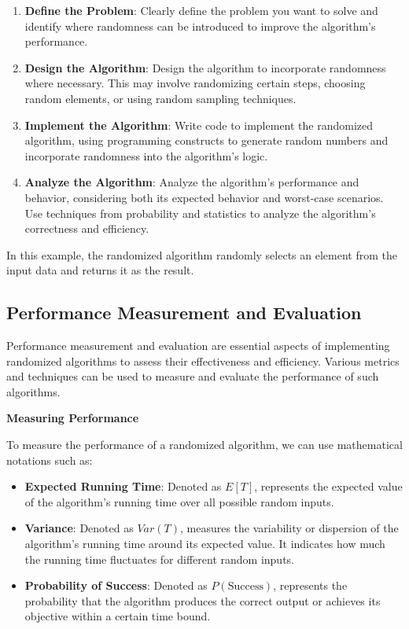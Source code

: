 \documentclass[12pt]{book} %
\begin{document}
\begin{enumerate}
    \item \textbf{Define the Problem}: Clearly define the problem you want to solve and identify where randomness can be introduced to improve the algorithm's performance.
    
    \item \textbf{Design the Algorithm}: Design the algorithm to incorporate randomness where necessary. This may involve randomizing certain steps, choosing random elements, or using random sampling techniques.
    
    \item \textbf{Implement the Algorithm}: Write code to implement the randomized algorithm, using programming constructs to generate random numbers and incorporate randomness into the algorithm's logic.
    
    \item \textbf{Analyze the Algorithm}: Analyze the algorithm's performance and behavior, considering both its expected behavior and worst-case scenarios. Use techniques from probability and statistics to analyze the algorithm's correctness and efficiency.
\end{enumerate}

In this example, the randomized algorithm randomly selects an element from the input data and returns it as the result.

\subsection{Performance Measurement and Evaluation}

Performance measurement and evaluation are essential aspects of implementing randomized algorithms to assess their effectiveness and efficiency. Various metrics and techniques can be used to measure and evaluate the performance of such algorithms.

\textbf{Measuring Performance}

To measure the performance of a randomized algorithm, we can use mathematical notations such as:

\begin{itemize}
    \item \textbf{Expected Running Time}: Denoted as \(E[T]\), represents the expected value of the algorithm's running time over all possible random inputs.
    
    \item \textbf{Variance}: Denoted as \(Var(T)\), measures the variability or dispersion of the algorithm's running time around its expected value. It indicates how much the running time fluctuates for different random inputs.
    
    \item \textbf{Probability of Success}: Denoted as \(P(\text{Success})\), represents the probability that the algorithm produces the correct output or achieves its objective within a certain time bound.
\end{itemize}
\end{document}
